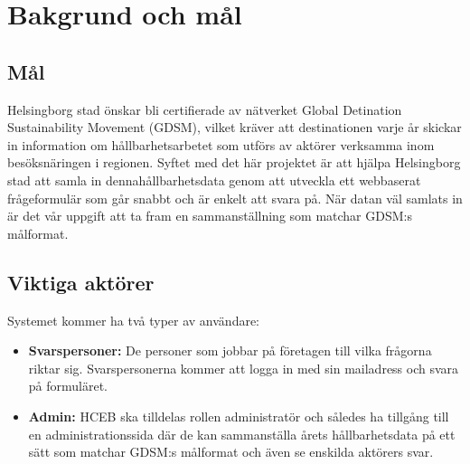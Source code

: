 \documentclass{article}
\begin{document}
\section{Bakgrund och mål}
                                                                                                                
    \subsection{Mål}
      Helsingborg stad önskar bli certifierade av nätverket Global Detination Sustainability Movement (GDSM), vilket kräver att destinationen varje år skickar in information om hållbarhetsarbetet som utförs av aktörer verksamma inom besöksnäringen i regionen. Syftet med det här projektet är att hjälpa Helsingborg stad att samla in dennahållbarhetsdata genom att utveckla ett webbaserat frågeformulär som går snabbt och är enkelt att svara på. När datan väl samlats in är det vår uppgift att ta fram en sammanställning som matchar GDSM:s målformat. 
        
    \subsection{Viktiga aktörer}
    Systemet kommer ha två typer av användare:
    \begin{itemize}
        \item \textbf{Svarspersoner:} De personer som jobbar på företagen till vilka frågorna riktar sig. Svarspersonerna kommer att logga in med sin mailadress och svara på formuläret.
        \item \textbf{Admin:} HCEB ska tilldelas rollen administratör och således ha tillgång till en administrationssida där de kan sammanställa årets hållbarhetsdata på ett sätt som matchar GDSM:s målformat och även se enskilda aktörers svar.
     \end{itemize}
    
\end{document}
